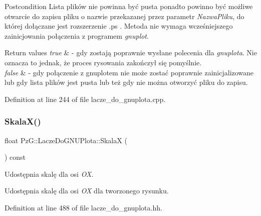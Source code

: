 \begin{DoxyPostcond}{Postcondition}
Lista plików nie powinna być pusta ponadto powinno być możliwe otwarcie do zapisu pliku o nazwie przekazanej przez parametr {\itshape Nazwa\+Pliku}, do której dołączane jest rozszerzenie .ps . Metoda nie wymaga wcześniejszego zainicjowania połączenia z programem {\itshape gnuplot}.
\end{DoxyPostcond}

\begin{DoxyRetVals}{Return values}
{\em true} & -\/ gdy zostają poprawnie wysłane polecenia dla {\itshape gnuplota}. Nie oznacza to jednak, że proces rysowania zakończył się pomyślnie. \\
\hline
{\em false} & -\/ gdy połączenie z gnuplotem nie może zostać poprawnie zainicjalizowane lub gdy lista plików jest pusta lub też gdy nie można otworzyć pliku do zapisu. \\
\hline
\end{DoxyRetVals}


Definition at line 244 of file lacze\+\_\+do\+\_\+gnuplota.\+cpp.

\mbox{\label{class_pz_g_1_1_lacze_do_g_n_u_plota_a4b1eb252fd785a5aeff938e7b2dce2b1}} 
\subsubsection{\texorpdfstring{Skala\+X()}{SkalaX()}}
{\footnotesize\ttfamily float Pz\+G\+::\+Lacze\+Do\+G\+N\+U\+Plota\+::\+SkalaX (\begin{DoxyParamCaption}{ }\end{DoxyParamCaption}) const\hspace{0.3cm}{\ttfamily [inline]}}



Udostępnia skalę dla osi {\itshape OX}. 

Udostępnia skalę dla osi {\itshape OX} dla tworzonego rysunku. 

Definition at line 488 of file lacze\+\_\+do\+\_\+gnuplota.\+hh.

\mbox{\label{class_pz_g_1_1_lacze_do_g_n_u_plota_a44f922ccbc508d6cd7809c669238dae3}} 
